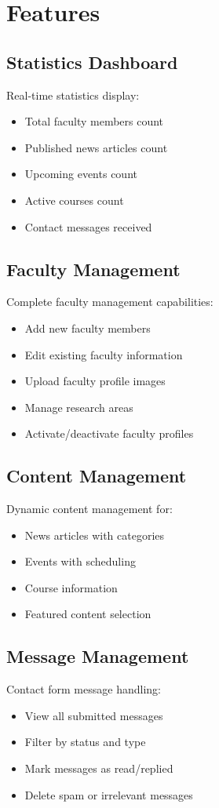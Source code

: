 \documentclass[12pt,a4paper]{report}
\begin{document}
\section{Features}
\subsection{Statistics Dashboard}
Real-time statistics display:
\begin{itemize}
    \item Total faculty members count
    \item Published news articles count
    \item Upcoming events count
    \item Active courses count
    \item Contact messages received
\end{itemize}

\subsection{Faculty Management}
Complete faculty management capabilities:
\begin{itemize}
    \item Add new faculty members
    \item Edit existing faculty information
    \item Upload faculty profile images
    \item Manage research areas
    \item Activate/deactivate faculty profiles
\end{itemize}

\subsection{Content Management}
Dynamic content management for:
\begin{itemize}
    \item News articles with categories
    \item Events with scheduling
    \item Course information
    \item Featured content selection
\end{itemize}

\subsection{Message Management}
Contact form message handling:
\begin{itemize}
    \item View all submitted messages
    \item Filter by status and type
    \item Mark messages as read/replied
    \item Delete spam or irrelevant messages
\end{itemize}
\end{document}
